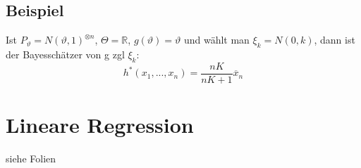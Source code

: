 \documentclass[german,10pt,oneside, fleqn, a4paper]{article}
\newcommand {\R}	{\mathbb{R}}
\newcommand{\1}[1]{1_{#1}}
\newcommand{\2}[1]{\1{\brac{#1}}}
\newcommand{\stuff}{{\otimes n}}
\begin{document}
\subsection{Beispiel}
\label{14.6}
Ist $P_\vartheta=N(\vartheta,1)^\stuff$, $\Theta=\R$, $g(\vartheta)=\vartheta$ und wählt man $\xi_k=N(0,k)$, dann ist der Bayesschätzer von g zgl $\xi_k$: \[h^*(x_1,...,x_n)=\dfrac{nK}{nK+1}\overline x_n\]

\section{Lineare Regression}
siehe Folien
\end{document}
